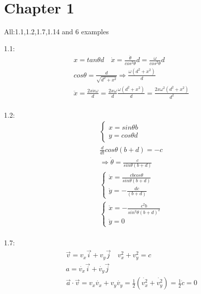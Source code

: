 \documentclass{article}
\begin{document}
\section{Chapter 1}
All:1.1,1.2,1.7,1.14 and 6 examples

1.1:
\begin{align*}
&x=tan\theta d\quad \dot{x}=\frac{\dot{\theta}}{cos^2\theta}d=\frac{\omega}{cos^2\theta}d \\
&cos\theta=\frac{d}{\sqrt{d^2+x^2}}\Rightarrow \frac{\omega(d^2+x^2)}{d}  \\
&\ddot{x}=\frac{2x\dot{x}\omega}{d}=\frac{2x\omega}{d}\frac{\omega(d^2+x^2)}{d}=\frac{2x\omega^2(d^2+x^2)}{d^2} \\
\end{align*}

1.2:
\begin{align*}
&\begin{cases}
x=sin\theta b\\
y=cos\theta d
\end{cases}\\
&\frac{d}{dt} cos \theta(b+d)=-c \\
&\Rightarrow  \dot{\theta}=\frac{c}{sin\theta(b+d)} \\
&\begin{cases}
  \dot{x}=  \frac{cbcos\theta}{sin\theta(b+d)}\\
  \dot{y}=- \frac{dc}{(b+d)}
\end{cases}\\
&\begin{cases}
  \ddot{x}=- \frac{c^2b}{sin^3\theta(b+d)^2} \\
  \ddot{y}=0
\end{cases}\\
\end{align*}

1.7:
\begin{align*}
&\vec v=v_x\vec i+v_y \vec j \quad v_x^2+v_y^2=c \\
&a=\dot{v_x}\vec i+\dot{v_y}\vec j \\
&\vec a\cdot\vec v=v_x\dot{v_x}+v_y\dot{v_y}=\frac12(\dot{v_x^2}+\dot{v_y^2})=\frac12\dot{c}=0 \\
\end{align*}
\end{document}
